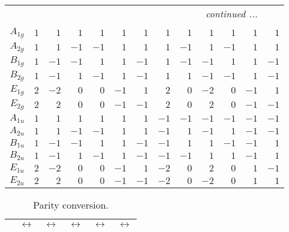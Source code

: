 \documentclass[fleqn,10pt,landscape]{article}
\begin{document}
\begin{itemize}
\begin{center}
\begin{longtable}{c|rrrrrrrrrrrr}
 \hline \hline
\multicolumn{12}{r}{\footnotesize\it continued ...} \\ \endfoot

 \hline \hline
\multicolumn{12}{r}{} \\ \endlastfoot

$ A_{1g} $ & $ 1 $ & $ 1 $ & $ 1 $ & $ 1 $ & $ 1 $ & $ 1 $ & $ 1 $ & $ 1 $ & $ 1 $ & $ 1 $ & $ 1 $ & $ 1 $ \\
$ A_{2g} $ & $ 1 $ & $ 1 $ & $ -1 $ & $ -1 $ & $ 1 $ & $ 1 $ & $ 1 $ & $ -1 $ & $ 1 $ & $ -1 $ & $ 1 $ & $ 1 $ \\
$ B_{1g} $ & $ 1 $ & $ -1 $ & $ -1 $ & $ 1 $ & $ 1 $ & $ -1 $ & $ 1 $ & $ -1 $ & $ -1 $ & $ 1 $ & $ 1 $ & $ -1 $ \\
$ B_{2g} $ & $ 1 $ & $ -1 $ & $ 1 $ & $ -1 $ & $ 1 $ & $ -1 $ & $ 1 $ & $ 1 $ & $ -1 $ & $ -1 $ & $ 1 $ & $ -1 $ \\
$ E_{1g} $ & $ 2 $ & $ -2 $ & $ 0 $ & $ 0 $ & $ -1 $ & $ 1 $ & $ 2 $ & $ 0 $ & $ -2 $ & $ 0 $ & $ -1 $ & $ 1 $ \\
$ E_{2g} $ & $ 2 $ & $ 2 $ & $ 0 $ & $ 0 $ & $ -1 $ & $ -1 $ & $ 2 $ & $ 0 $ & $ 2 $ & $ 0 $ & $ -1 $ & $ -1 $ \\
$ A_{1u} $ & $ 1 $ & $ 1 $ & $ 1 $ & $ 1 $ & $ 1 $ & $ 1 $ & $ -1 $ & $ -1 $ & $ -1 $ & $ -1 $ & $ -1 $ & $ -1 $ \\
$ A_{2u} $ & $ 1 $ & $ 1 $ & $ -1 $ & $ -1 $ & $ 1 $ & $ 1 $ & $ -1 $ & $ 1 $ & $ -1 $ & $ 1 $ & $ -1 $ & $ -1 $ \\
$ B_{1u} $ & $ 1 $ & $ -1 $ & $ -1 $ & $ 1 $ & $ 1 $ & $ -1 $ & $ -1 $ & $ 1 $ & $ 1 $ & $ -1 $ & $ -1 $ & $ 1 $ \\
$ B_{2u} $ & $ 1 $ & $ -1 $ & $ 1 $ & $ -1 $ & $ 1 $ & $ -1 $ & $ -1 $ & $ -1 $ & $ 1 $ & $ 1 $ & $ -1 $ & $ 1 $ \\
$ E_{1u} $ & $ 2 $ & $ -2 $ & $ 0 $ & $ 0 $ & $ -1 $ & $ 1 $ & $ -2 $ & $ 0 $ & $ 2 $ & $ 0 $ & $ 1 $ & $ -1 $ \\
$ E_{2u} $ & $ 2 $ & $ 2 $ & $ 0 $ & $ 0 $ & $ -1 $ & $ -1 $ & $ -2 $ & $ 0 $ & $ -2 $ & $ 0 $ & $ 1 $ & $ 1 $ \\
\end{longtable}
\end{center}
\begin{center}
\renewcommand{\arraystretch}{1.0}
\begin{longtable}{cccccc}
\caption{Parity conversion.}
 \\
 \hline \hline
 & $\leftrightarrow$ & $\leftrightarrow$ & $\leftrightarrow$ & $\leftrightarrow$ & $\leftrightarrow$ \\ \hline \endfirsthead


\end{longtable}
\end{center}
\end{itemize}
\end{document}
